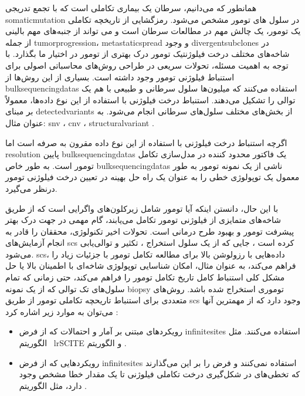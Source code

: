 همانطور که می‌دانیم، سرطان یک بیماری تکاملی است که با تجمع تدریجی \gls{somaticmutation} در سلول های تومور مشخص می‌شود. رمزگشایی از تاریخچه تکاملی یک تومور، یک چالش مهم در مطالعات سرطان است و می تواند از جنبه‌های مهم بالینی از جمله \gls{tumorprogression}،  \gls{metastaticspread} و وجود \gls{divergentsubclones} در شاخه‌های مختلف درخت فیلوژنتیک تومور درک بهتری از تومور در اختیار ما بگذارد. با توجه به اهمیت مسئله، تحولات سریعی در طراحی روش‌های محاسباتی اصولی برای استنباط فیلوژنی تومور وجود داشته است.  بسیاری از این روش‌ها از \glspl{bulksequencingdata} استفاده می‌کنند که  میلیون‌ها سلول سرطانی و طبیعی با هم یک توالی را تشکیل می‌دهند. استنباط درخت فیلوژنی با استفاده از این نوع داده‌ها، معمولاً بر مبنای \gls{detectedvariants} از بخش‌های مختلف سلول‌های سرطانی انجام می‌شود. به عنوان مثال:
 \gls{snv} \cite{strino2013trap, el2015reconstruction, malikic2020studying, donmez2016clonality, satas2017tumor, husic2019mipup}،  \gls{cnv} \cite{zaccaria2017copy}، \gls{structuralvariant} \cite{eaton2018deconvolution, ricketts2020meltos}.
 
 اگرچه استنباط درخت فیلوژنی با استفاده از این نوع داده مقرون به صرفه است اما \gls{resolution} پایین \glspl{bulksequencingdata} یک فاکتور محدود کننده در مدل‌سازی تکامل تومور است. به طور خاص \glspl{bulksequencingdata} ناشی از یک نمونه تومور به طور معمول یک توپولوژی خطی را به عنوان یک راه حل بهینه در تعیین درخت فیلوژنی تومور درنظر می‌گیرد. \cite{donmez2016clonality}
 
 
 با این حال، دانستن اینکه آیا تومور شامل زیرکلون‌های واگرایی است که از طریق شاخه‌های متمایزی از فیلوژنی تومور تکامل می‌یابند، گام مهمی در جهت درک بهتر پیشرفت تومور و بهبود طرح درمانی است. تحولات اخیر تکنولوژی، محققان را قادر به انجام آزمایش‌های \gls{scs} کرده است ، جایی که  از یک سلول استخراج ، تکثیر و توالی‌یابی می‌شود. \gls{scs}، داده‌هایی با رزولوشن بالا برای مطالعه تکامل تومور با جزئیات زیاد را فراهم می‌کند، به عنوان مثال، امکان شناسایی توپولوژی شاخه‌ای با اطمینان بالا یا حل مشکل کلی استنباط کامل تاریخ تکامل تومور را فراهم می‌کند، حتی زمانی که تمام سلول‌های تک توالی که از یک نمونه \gls{biopsy} توموری استخراج شده باشد. روش‌های متعددی برای استنباط تاریحچه تکاملی تومور  از طریق  \gls{scs} وجود دارد که از مهمترین آنها می‌توان به موارد زیر اشاره کرد :  
 
 \begin{itemize}
 	\item رویکردهای مبتنی بر آمار و احتمالات که از فرض \gls{infinitesites}  استفاده می‌کنند. مثل الگوریتم \ lr{SCITE}  \cite{jahn2016tree} و الگوریتم   \cite{ross2016onconem}. 
\item رویکردهایی که از فرض \gls{infinitesites} استفاده نمی‌کنند و فرض را بر این می‌گذارند که تخطی‌های در شکل‌گیری درخت تکاملی فیلوژنی تا یک مقدار خطا مشخص وجود دارد، مثل الگوریتم  \cite{zafar2017sifit}.  
 \end{itemize}


